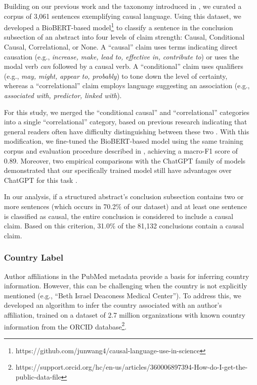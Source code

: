 \begin{appendices}
Building on our previous work  \citep{yu2019EMNLPCausalLanguage} 
and the taxonomy introduced in \citep{sumner2014association,li2017nlp}, we
curated a corpus of 3,061 sentences exemplifying causal language. Using this
dataset, we developed a BioBERT-based
model\footnote{https://github.com/junwang4/causal-language-use-in-science} to
classify a sentence in the conclusion subsection of an abstract into four levels
of claim strength: Causal, Conditional Causal, Correlational, or None. 
A “causal” claim uses terms indicating direct causation (e.g., {\em increase,
make, lead to, effective in, contribute to}) or uses the modal verb {\em can}
followed by a causal verb. A “conditional” claim uses qualifiers (e.g., {\em
may, might, appear to, probably}) to tone down the level of certainty, whereas a
“correlational” claim employs language suggesting an association (e.g., {\em
associated with, predictor, linked with}).

For this study, we merged the “conditional causal” and “correlational”
categories into a single “correlational” category, based on previous research
indicating that general readers often have difficulty distinguishing between these
two \citep{adams2017readers, bratton2020causal}. With this modification, we
fine-tuned the BioBERT-based model using the same training corpus and evaluation
procedure described in \citep{yu2019EMNLPCausalLanguage}, achieving a macro-F1
score of 0.89. Moreover, two empirical comparisons with the ChatGPT family of
models demonstrated that our specifically trained model still have advantages over ChatGPT for
this task \citep{kim2023can, chen2024evaluating}.

In our analysis, if a structured abstract’s conclusion subsection contains two
or more sentences (which occurs in 70.2\% of our dataset) and at least one
sentence is classified as causal, the entire conclusion is considered to include
a causal claim. Based on this criterion, 31.0\% of the 81,132 conclusions
contain a causal claim.

\subsubsection{Country Label} \label{si_country}

Author affiliations in the PubMed metadata provide a basis for inferring country
information. However, this can be challenging when the country is not explicitly
mentioned (e.g., “Beth Israel Deaconess Medical Center”). To address this, we
developed an algorithm to infer the country associated with an author’s
affiliation, trained on a dataset of 2.7 million organizations with known
country information from the ORCID
database\footnote{https://support.orcid.org/hc/en-us/articles/360006897394-How-do-I-get-the-public-data-file}.


\end{appendices}

